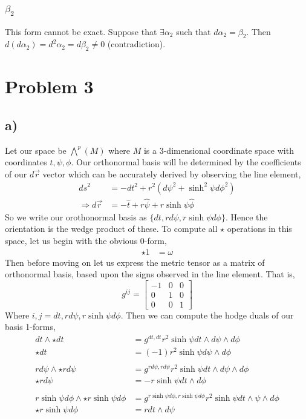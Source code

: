 \documentclass{article}
\theoremstyle{definition}
\begin{document}
\subsubsection*{$\beta_2$}
This form cannot be exact. Suppose that $\exists \alpha_2$ such that $d\alpha_2 = \beta_2$.
Then $d(d\alpha_2) = d^2 \alpha_2 = d\beta_2 \neq 0$ (contradiction).
\section*{Problem 3}
\subsection*{a)}
Let our space be $\bigwedge^p(M)$ where $M$ is a 3-dimensional coordinate space with coordinates $t, \psi, \phi$.
Our orthonormal basis will be determined by the coefficients of our $d\vec{r}$ vector which can be 
accurately derived by observing the line element, 
\begin{align*}
    ds^2 &= -dt^2 + r^2(d\psi^2 + \sinh^2\psi d\phi^2)\\
    \Longrightarrow d\vec{r} &= -\hat t + r \hat \psi + r\sinh \psi \hat \phi
\end{align*}
So we write our orothonormal basis as $\{dt, rd\psi, r\sinh\psi d\phi\}$. Hence the orientation 
is the wedge product of these.
To compute all $\star$ operations in this space, let us begin with the obvious 0-form,
\begin{align*}
    \star 1 &= \omega
\end{align*}
Then before moving on let us express the metric tensor as a matrix of orthonormal basis, based upon the signs observed 
in the line element. That is,
\[
    g^{ij} = \begin{bmatrix}
        -1 &0&0\\0&1&0\\0&0&1
    \end{bmatrix}
\]
Where $i,j = dt, rd\psi,r\sinh\psi d\phi$. Then we can compute the hodge duals of our basis 1-forms,
\begin{align*}
    dt \wedge \star dt &= g^{dt,dt}r^2 \sinh\psi dt \wedge d\psi \wedge d\phi \\
    \star dt &= (-1)r^2 \sinh\psi d\psi \wedge d\phi\\\\
    rd\psi \wedge \star rd\psi &= g^{rd\psi, rd\psi}r^2 \sinh\psi dt \wedge d\psi \wedge d\phi \\
    \star rd\psi &= -r\sinh\psi dt \wedge d\phi \\\\
    r\sinh\psi d\phi \wedge \star r\sinh\psi d\phi  &= g^{r\sinh\psi d\phi, r\sinh\psi d\phi }r^2 \sinh\psi dt \wedge \psi \wedge d\phi \\
    \star r\sinh\psi d\phi &= rdt \wedge d\psi
\end{align*}
\end{document}
